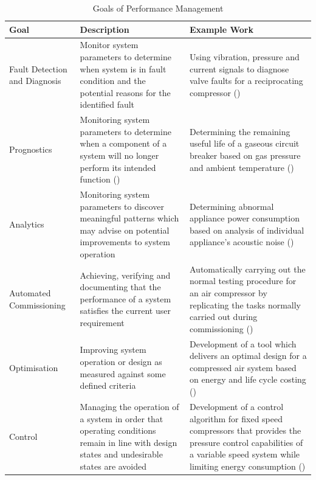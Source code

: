 \begin{table}
  \centering
  \caption{Goals of Performance Management}
    \begin{tabular}{p{.3\linewidth}p{.3\linewidth}p{.3\linewidth}}
    \toprule
    Goal  & Description & Example Work \\
    \midrule
    Fault Detection and Diagnosis & Monitor system parameters to determine when system is in fault condition and the potential reasons for the identified fault & Using vibration, pressure and current signals to diagnose valve faults for a reciprocating compressor (\cite{Tran2014}) \\
    Prognostics & Monitoring system parameters to determine when a component of a system will no longer perform its intended function (\cite{Vachtsevanos2006}) & Determining the remaining useful life of a gaseous circuit breaker  based on gas pressure and ambient temperature (\cite{Catterson2013}) \\
    Analytics & Monitoring system parameters to discover meaningful patterns which may advise on potential improvements to system operation & Determining abnormal appliance power consumption based on analysis of individual appliance’s acoustic noise (\cite{Pathak2015}) \\
    Automated Commissioning & Achieving, verifying and documenting that the performance of a system satisfies the current user requirement & Automatically carrying out the normal testing procedure for an air compressor by replicating the tasks normally carried out during commissioning (\cite{Mazid2008}) \\
    Optimisation & Improving system operation or design as measured against some defined criteria & Development of a tool which delivers an optimal design for a compressed air system based on energy and life cycle costing (\cite{Friden2012}) \\
    Control & Managing the operation of a system in order that operating conditions remain in line with design states and undesirable states are avoided & Development of a control algorithm for fixed speed compressors that provides the pressure control capabilities of a variable speed system while limiting energy consumption (\cite{Facchinetti}) \\
    \bottomrule
    \end{tabular}%
  \label{tab:goalsmgmt}%
\end{table}%

